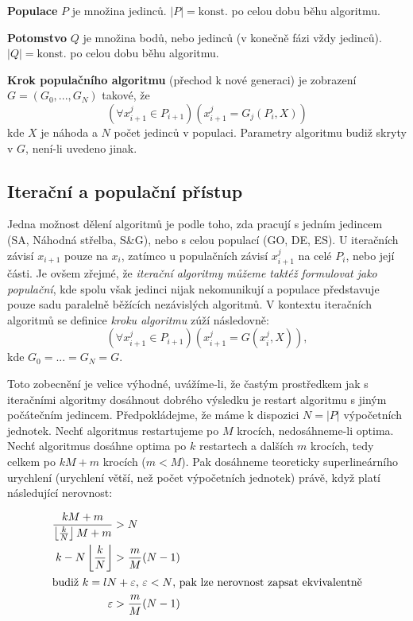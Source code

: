 \par{\textbf{Populace} $P$ je množina jedinců. $|P| =\text{konst.}$ po celou dobu běhu algoritmu.}

\par{\textbf{Potomstvo} $Q$ je množina bodů, nebo jedinců (v konečně fázi vždy jedinců). $|Q| =\text{konst.}$ po celou dobu běhu algoritmu.}

\par{\textbf{Krok populačního algoritmu} (přechod k nové generaci) je zobrazení $G = (G_0,...,G_N)$ takové, že
$$(\forall x^j_{i+1} \in P_{i+1})( x^j_{i+1} = G_j(P_i,X))$$} 
kde $X$ je náhoda a $N$ počet jedinců v populaci. Parametry algoritmu budiž skryty v $G$, není-li uvedeno jinak.

\subsection{Iterační a populační přístup}\label{iteracni vs populacni}

Jedna možnost dělení algoritmů je podle toho, zda pracují s jedním jedincem (SA, Náhodná střelba, S\&G), nebo s celou populací (GO, DE, ES). U iteračních závisí $x_{i+1}$ pouze na $x_i$, zatímco u populačních závisí $x^j_{i+1}$ na celé $P_i$, nebo její části. Je ovšem zřejmé, že \emph{iterační algoritmy můžeme taktéž formulovat jako populační}, kde spolu však jedinci nijak nekomunikují a populace představuje pouze sadu paralelně běžících nezávislých algoritmů. V kontextu iteračních algoritmů se definice \emph{kroku algoritmu} zúží následovně: 
$$(\forall x^j_{i+1} \in P_{i+1})( x^j_{i+1} = G(x^j_i,X)),$$
kde $G_0 = ... = G_N = G$.

Toto zobecnění je velice výhodné, uvážíme-li, že častým prostředkem jak s iteračními algoritmy dosáhnout dobrého výsledku je restart algoritmu s jiným počátečním jedincem. Předpokládejme, že máme k dispozici $N =|P|$ výpočetních jednotek. Nechť algoritmus restartujeme po $M$ krocích, nedosáhneme-li optima. Nechť algoritmus dosáhne optima po $k$ restartech a dalších $m$ krocích, tedy celkem po $kM + m$ krocích ($m<M$). Pak dosáhneme teoreticky superlineárního urychlení (urychlení větší, než počet výpočetních jednotek) právě, když platí následující nerovnost:

\begin{align}
  \frac{kM+m}{\left\lfloor\frac{k}{N}\right\rfloor M+m} & > N \\
  k - N\left\lfloor\frac{k}{N}\right\rfloor & >\frac{m}{M}(N-1)\\
  \intertext{budiž $k=lN+\varepsilon$, $\varepsilon < N$, pak lze nerovnost zapsat ekvivalentně}
  \varepsilon & >\frac{m}{M}(N-1)
\end{align}


